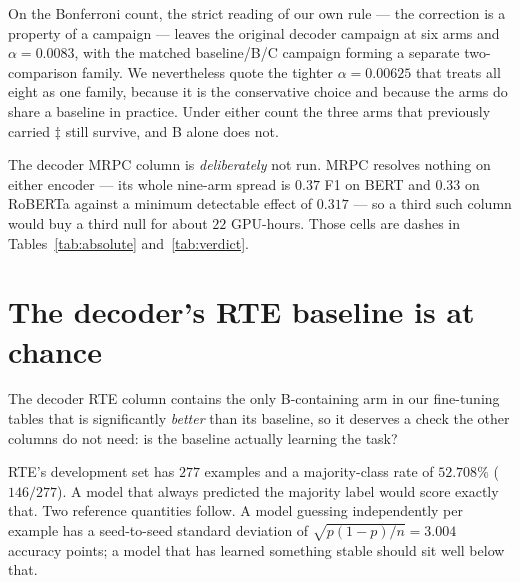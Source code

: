\documentclass{article}
\begin{document}
On the Bonferroni count, the strict reading of our own rule --- the correction is
a property of a campaign --- leaves the original decoder campaign at six arms
and $\alpha=0.0083$, with the matched baseline/B/C campaign forming a separate
two-comparison family. We nevertheless quote the tighter $\alpha=0.00625$ that
treats all eight as one family, because it is the conservative choice and
because the arms do share a baseline in practice. Under either count the three
arms that previously carried $\ddagger$ still survive, and B alone does not.

The decoder MRPC column is \emph{deliberately} not run. MRPC resolves nothing on
either encoder --- its whole nine-arm spread is $0.37$ F1 on BERT and $0.33$ on
RoBERTa against a minimum detectable effect of $0.317$ --- so a third such column
would buy a third null for about $22$ GPU-hours. Those cells are dashes in
Tables~\ref{tab:absolute} and~\ref{tab:verdict}.

\section{The decoder's RTE baseline is at chance}
\label{app:chance}

The decoder RTE column contains the only B-containing arm in our fine-tuning
tables that is significantly \emph{better} than its baseline, so it deserves a
check the other columns do not need: is the baseline actually learning the task?

RTE's development set has $277$ examples and a majority-class rate of
$52.708\%$ ($146/277$). A model that always predicted the majority label would
score exactly that. Two reference quantities follow. A model guessing
independently per example has a seed-to-seed standard deviation of
$\sqrt{p(1-p)/n} = 3.004$ accuracy points; a model that has learned something
stable should sit well below that.
\end{document}
